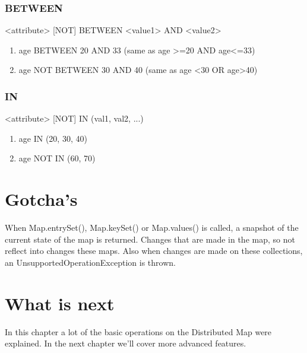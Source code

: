 \subsubsection{BETWEEN}
<attribute> [NOT] BETWEEN <value1> AND <value2>

\begin{enumerate}
\item age BETWEEN 20 AND 33 (same as age >=20 AND age<=33)
\item age NOT BETWEEN 30 AND 40 (same as age <30 OR age>40)
\end{enumerate}


\subsubsection{IN}
<attribute> [NOT] IN (val1, val2, ...)
\begin{enumerate}
\item age IN (20, 30, 40)
\item age NOT IN (60, 70)
\end{enumerate}

\section{Gotcha's}

When Map.entrySet(), Map.keySet() or Map.values() is called, a snapshot of the current state of the map is returned. Changes that are made in the map, so not reflect into changes these maps. Also when changes are made on these collections, an UnsupportedOperationException is thrown.

\section{What is next}
In this chapter a lot of the basic operations on the Distributed Map were explained. In the next chapter we'll cover more advanced features.